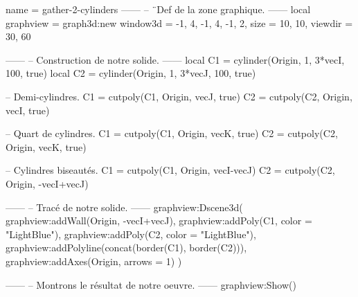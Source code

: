 \documentclass{standalone}
\begin{document}
\begin{luadraw}{name = gather-2-cylinders}
------
-- ¨Def de la zone graphique.
------
local graphview = graph3d:new{
  window3d = {-1, 4, -1, 4, -1, 2},
  size     = {10, 10},
  viewdir  = {30, 60}
}

------
-- Construction de notre solide.
------
local C1 = cylinder(Origin, 1, 3*vecI, 100, true)
local C2 = cylinder(Origin, 1, 3*vecJ, 100, true)

-- Demi-cylindres.
C1 = cutpoly(C1, {Origin, vecJ}, true)
C2 = cutpoly(C2, {Origin, vecI}, true)

-- Quart de cylindres.
C1 = cutpoly(C1, {Origin, vecK}, true)
C2 = cutpoly(C2, {Origin, vecK}, true)

-- Cylindres biseautés.
C1 = cutpoly(C1, {Origin, vecI-vecJ})
C2 = cutpoly(C2, {Origin, -vecI+vecJ})

------
-- Tracé de notre solide.
------
graphview:Dscene3d(
  graphview:addWall({Origin, -vecI+vecJ}),
  graphview:addPoly(C1, {color = "LightBlue"}),
  graphview:addPoly(C2, {color = "LightBlue"}),
  graphview:addPolyline(concat(border(C1), border(C2))),
  graphview:addAxes(Origin, {arrows = 1})
)

------
-- Montrons le résultat de notre oeuvre.
------
graphview:Show()
\end{luadraw}
\end{document}
